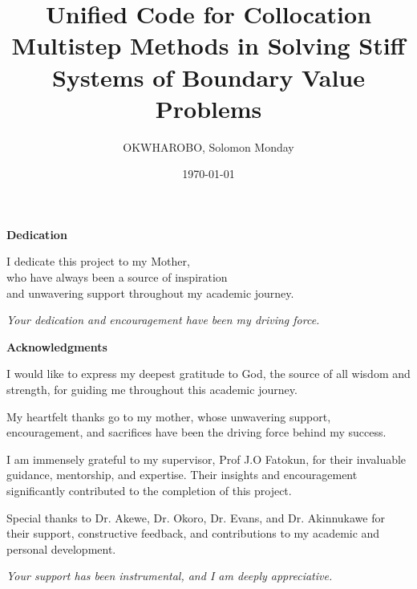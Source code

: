 \documentclass{report}
\begin{document}
\title{Unified Code for Collocation Multistep Methods in Solving Stiff Systems of Boundary Value Problems}
\author{OKWHAROBO, Solomon Monday}
\date{\today}
\maketitle


\begin{titlepage}
    \centering
    \vspace*{2cm}
    \LARGE\textbf{Dedication}
    
    \vspace{1cm}
    \large
    I dedicate this project to my Mother,\\
    who have always been a source of inspiration\\
    and unwavering support throughout my academic journey.

    \vspace{2cm}
    \textit{Your dedication and encouragement have been my driving force.}
\end{titlepage}


\begin{titlepage}
    \centering
    \vspace*{2cm}
    \LARGE\textbf{Acknowledgments}
    
    \vspace{1cm}
    \large
    I would like to express my deepest gratitude to God, the source of all wisdom and strength, for guiding me throughout this academic journey.

    \vspace{0.5cm}
    My heartfelt thanks go to my mother, whose unwavering support, encouragement, and sacrifices have been the driving force behind my success.

    \vspace{0.5cm}
    I am immensely grateful to my supervisor, Prof J.O Fatokun, for their invaluable guidance, mentorship, and expertise. Their insights and encouragement significantly contributed to the completion of this project.

    \vspace{0.5cm}
    Special thanks to Dr. Akewe, Dr. Okoro, Dr. Evans, and Dr. Akinnukawe for their support, constructive feedback, and contributions to my academic and personal development.

    \vspace{2cm}
    \textit{Your support has been instrumental, and I am deeply appreciative.}
\end{titlepage}
\end{document}

